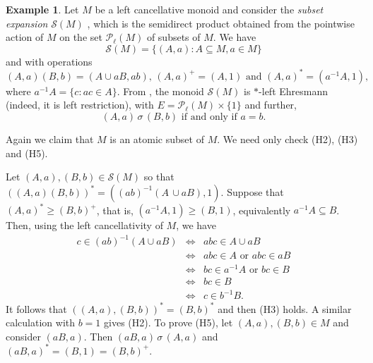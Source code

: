 \documentclass[12pt]{amsart}
\theoremstyle{definition}
\newtheorem{ex}[them]{Example}
\theoremstyle{definition}
\numberwithin{them}{section}
\numberwithin{equation}{section}
\begin{document}
\begin{ex} \label{ex:spsd} Let $M$ be a left cancellative monoid and consider the { {\em subset expansion} $\mathcal{S}(M)$  \cite{GJ}, which is the semidirect product} obtained from the pointwise action of $M$ on the set   $\mathcal{P}_{\ell}(M)$ of subsets of $M$. We have 
\[\mathcal{S}(M)=\{ (A,a):A\subseteq M, a\in M\}\]
and with operations
\[(A,a)(B,b)=(A\cup aB,ab),\, (A,a)^+=(A,1)\mbox{ and }(A,a)^*=(a^{-1}A,1),\]
where $a^{-1}A=\{ c:ac\in A\}$. 
From \cite{GJ}, the monoid  $\mathcal{S}(M)$ is  $*$-left  Ehresmann (indeed, it is left restriction),  with $E=\mathcal{P}_{\ell}(M) \times \{1\}$ and further,
\[(A,a)\,\sigma\, (B,b)\mbox{ if and only if }a=b.\]

Again we claim that $M$ is  an  atomic  subset of $M$. We need only check (H2), (H3) and (H5). 

Let  $(A,a),(B,b)\in \mathcal{S}(M)$ so that
$((A,a)(B,b))^*=((ab)^{-1}(A\, \cup aB),1)$. Suppose that
$(A,a)^*\geq (B,b)^+$, that is, $(a^{-1}A,1)\geq (B,1)$, equivalently  $a^{-1}A\subseteq B$. Then,
 using the left cancellativity of $M$,  we have
\[\begin{array}{rcl}
c\in (ab)^{-1}(A\cup aB)&\Leftrightarrow& abc\in A\cup aB\\
&\Leftrightarrow& abc\in A\mbox{ or }abc\in aB\\
&\Leftrightarrow& bc\in a^{-1}A\mbox{ or }bc\in B\\
&\Leftrightarrow& bc\in B\\
&\Leftrightarrow& c\in b^{-1}B.\end{array}
\]
It follows that $((A,a),(B,b))^*=(B,b)^*$ and then (H3) holds. A similar calculation with $b=1$ gives (H2). To prove (H5), let  $(A,a),(B,b)\in M$  and 
consider $(aB,a) $. Then $(aB,a)\,\sigma\,  (A,a)$ and
$(aB,a)^*=(B,1)=(B,b)^+$.
\end{ex}
\end{document}
